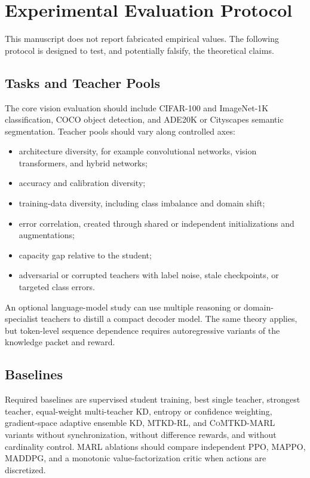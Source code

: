 \documentclass[10pt,twocolumn,a4paper]{article}
\newcommand{\CoMTKD}{\textsc{CoMTKD-MARL}\xspace}
\begin{document}
\section{Experimental Evaluation Protocol}
\label{sec:experiments}

This manuscript does not report fabricated empirical values. The following protocol is designed to test, and potentially falsify, the theoretical claims.

\subsection{Tasks and Teacher Pools}

The core vision evaluation should include CIFAR-100 and ImageNet-1K classification, COCO object detection, and ADE20K or Cityscapes semantic segmentation. Teacher pools should vary along controlled axes:

\begin{itemize}
    \item architecture diversity, for example convolutional networks, vision transformers, and hybrid networks;
    \item accuracy and calibration diversity;
    \item training-data diversity, including class imbalance and domain shift;
    \item error correlation, created through shared or independent initializations and augmentations;
    \item capacity gap relative to the student;
    \item adversarial or corrupted teachers with label noise, stale checkpoints, or targeted class errors.
\end{itemize}

An optional language-model study can use multiple reasoning or domain-specialist teachers to distill a compact decoder model. The same theory applies, but token-level sequence dependence requires autoregressive variants of the knowledge packet and reward.

\subsection{Baselines}

Required baselines are supervised student training, best single teacher, strongest teacher, equal-weight multi-teacher KD, entropy or confidence weighting, gradient-space adaptive ensemble KD, MTKD-RL, and \CoMTKD variants without synchronization, without difference rewards, and without cardinality control. MARL ablations should compare independent PPO, MAPPO, MADDPG, and a monotonic value-factorization critic when actions are discretized.
\end{document}

